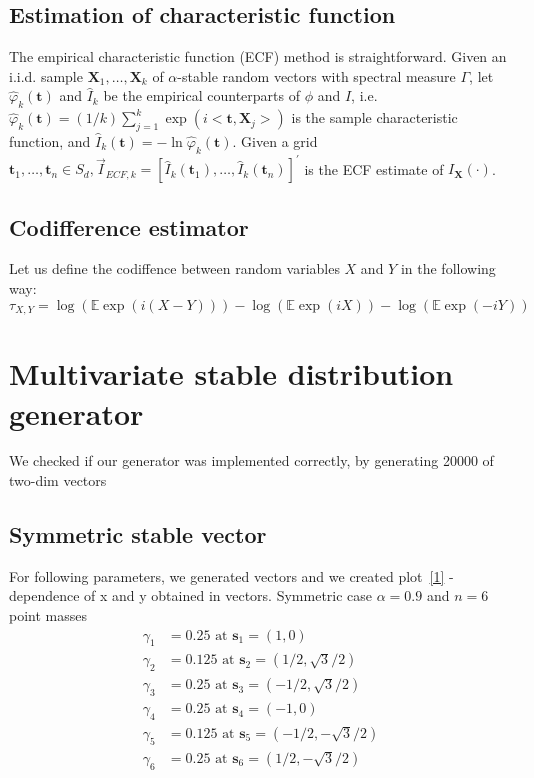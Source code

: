 \documentclass{article}
\begin{document}
	\subsection{Estimation of characteristic function} \label{teoCF}
	The empirical characteristic function (ECF) method is straightforward. Given an i.i.d. sample $\mathbf{X}_1, \ldots, \mathbf{X}_k$ of $\alpha$-stable random vectors with spectral measure $\Gamma$, let $\widehat{\varphi}_k(\mathbf{t})$ and $\widehat{I}_k$ be the empirical counterparts of $\phi$ and $I$, i.e. $\widehat{\varphi}_k(\mathbf{t})=(1 / k) \sum_{j=1}^k \exp \left(i<\mathbf{t}, \mathbf{X}_j>\right)$ is the sample characteristic function, and $\widehat{I}_k(\mathbf{t})=-\ln \widehat{\varphi}_k(\mathbf{t})$. Given a grid $\mathbf{t}_1, \ldots, \mathbf{t}_n \in S_d, \vec{I}_{E C F, k}=\left[\hat{I}_k\left(\mathbf{t}_1\right), \ldots, \hat{I}_k\left(\mathbf{t}_n\right)\right]^{\prime}$ is the ECF estimate of $I_{\mathbf{X}}(\cdot)$.
	
	\subsection{Codifference estimator}
	Let us define the codiffence between random variables $X$ and $Y$ in the following way:
	$$
	\tau_{X, Y}=\log (\mathbb{E} \exp (i(X-Y)))-\log (\mathbb{E} \exp (i X))-\log (\mathbb{E} \exp (-i Y))
	$$
	\section{Multivariate stable distribution generator}
	
	We checked if our generator was implemented correctly, by generating 20000 of two-dim vectors
	
	\subsection{Symmetric stable vector}
	For following parameters, we generated vectors and we created plot~\ref{1} - dependence of x and y obtained in vectors.
	Symmetric case $\alpha=0.9$ and $n=6$ point masses
	$$
	\begin{aligned}
		\gamma_1 & =0.25 \text { at } \mathbf{s}_1=(1,0) \\
		\gamma_2 & =0.125 \text { at } \mathbf{s}_2=(1 / 2, \sqrt{3} / 2) \\
		\gamma_3 & =0.25 \text { at } \mathbf{s}_3=(-1 / 2, \sqrt{3} / 2) \\
		\gamma_4 & =0.25 \text { at } \mathbf{s}_4=(-1,0) \\
		\gamma_5 & =0.125 \text { at } \mathbf{s}_5=(-1 / 2,-\sqrt{3} / 2) \\
		\gamma_6 & =0.25 \text { at } \mathbf{s}_6=(1 / 2,-\sqrt{3} / 2)
	\end{aligned}
	$$
	
\end{document}
